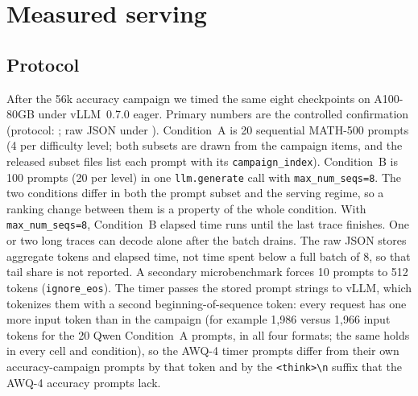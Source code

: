 \documentclass[11pt,a4paper]{article}
\begin{document}
\FloatBarrier
\section{Measured serving}
\label{app:serving}
\subsection{Protocol}
\label{sec:measured-serving}
After the 56k accuracy campaign we timed the same eight checkpoints on A100-80GB under vLLM~0.7.0 eager. Primary numbers are the controlled confirmation (protocol: ; raw JSON under ). Condition~A is 20 sequential MATH-500 prompts (4 per difficulty level; both subsets are drawn from the campaign items, and the released subset files list each prompt with its \texttt{campaign\_index}). Condition~B is 100 prompts (20 per level) in one \texttt{llm.generate} call with \texttt{max\_num\_seqs=8}. The two conditions differ in both the prompt subset and the serving regime, so a ranking change between them is a property of the whole condition. With \texttt{max\_num\_seqs=8}, Condition~B elapsed time runs until the last trace finishes. One or two long traces can decode alone after the batch drains. The raw JSON stores aggregate tokens and elapsed time, not time spent below a full batch of 8, so that tail share is not reported. A secondary microbenchmark forces 10 prompts to 512 tokens (\texttt{ignore\_eos}). The timer passes the stored prompt strings to vLLM, which tokenizes them with a second beginning-of-sequence token: every request has one more input token than in the campaign (for example 1{,}986 versus 1{,}966 input tokens for the 20 Qwen Condition~A prompts, in all four formats; the same holds in every cell and condition), so the AWQ-4 timer prompts differ from their own accuracy-campaign prompts by that token and by the \texttt{<think>\textbackslash n} suffix that the AWQ-4 accuracy prompts lack.
\end{document}
